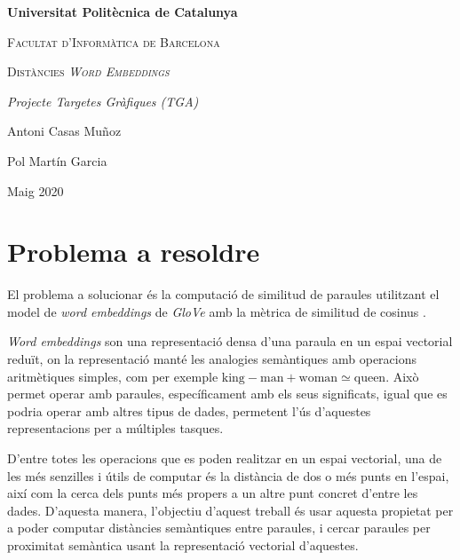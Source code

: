 \documentclass[catalan,10pt,a4paper]{article}
\begin{document}
	\begin{titlepage}
		\centering
		{\bfseries\LARGE Universitat Politècnica de Catalunya \par}
		\vspace{1cm}
		{\scshape\Large Facultat d'Informàtica de Barcelona\par}
		\vspace{3cm}
		{\scshape\Huge Distàncies \textit{Word Embeddings} \par}
		\vspace{3cm}
		{\itshape\Large Projecte Targetes Gràfiques (TGA) \par}
		\vfill
		{\Large Antoni Casas Muñoz \par}
		{\Large Pol Martín Garcia \par}
		\vfill
		{\Large Maig 2020 \par}
	\end{titlepage}
	
	\newpage
	
\section*{Problema a resoldre}

El problema a solucionar és la computació de similitud de paraules utilitzant el model de \textit{word embeddings} de \textit{GloVe} \cite{GloVeGlo18:online} amb la mètrica de similitud de cosinus \cite{Cosinesi72:online}.

\textit{Word embeddings} son una representació densa d'una paraula en un espai vectorial reduït, on la representació manté les analogies semàntiques amb operacions aritmètiques simples, com per exemple $\text{king} - \text{man} + \text{woman} \simeq \text{queen}$. Això permet operar amb paraules, específicament amb els seus significats, igual que es podria operar amb altres tipus de dades, permetent l'ús d'aquestes representacions per a múltiples tasques.

D'entre totes les operacions que es poden realitzar en un espai vectorial, una de les més senzilles i útils de computar és la distància de dos o més punts en l'espai, així com la cerca dels punts més propers a un altre punt concret d'entre les dades. D'aquesta manera, l'objectiu d'aquest treball és usar aquesta propietat per a poder computar distàncies semàntiques entre paraules, i cercar paraules per proximitat semàntica usant la representació vectorial d'aquestes.
\end{document}
